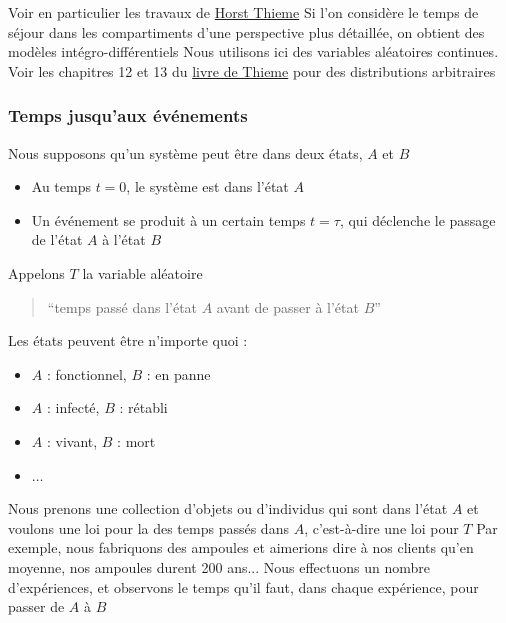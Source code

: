 \documentclass[aspectratio=169]{beamer}\usepackage[]{graphicx}\usepackage[]{xcolor}
\begin{document}
\begin{frame}
Voir en particulier les travaux de \href{https://scholar.google.ca/citations?user=o7R6ZHMAAAAJ}{Horst Thieme}
\vfill
Si l'on considère le temps de séjour dans les compartiments d'une perspective plus détaillée, on obtient des modèles intégro-différentiels
\vfill
Nous utilisons ici des variables aléatoires continues. Voir les chapitres 12 et 13 du \href{https://press.princeton.edu/books/paperback/9780691092911/mathematics-in-population-biology}{livre de Thieme} pour des distributions arbitraires
\end{frame}


\begin{frame}\frametitle{Temps jusqu'aux événements}
Nous supposons qu'un système peut être dans deux états, $A$ et $B$
\begin{itemize}
\item Au temps $t=0$, le système est dans l'état $A$
\item Un événement se produit à un certain temps $t=\tau$, qui déclenche le passage de
l'état $A$ à l'état $B$
\end{itemize}
\vfill
Appelons $T$ la variable aléatoire 
\begin{quote}
``temps passé dans l'état $A$ avant de passer à l'état $B$''
\end{quote}
\end{frame}

\begin{frame}
Les états peuvent être n'importe quoi :
\begin{itemize}
\item $A$ : fonctionnel, $B$ : en panne
\item $A$ : infecté, $B$ : rétabli
\item $A$ : vivant, $B$ : mort
\item $\ldots$
\end{itemize}
\vfill
Nous prenons une collection d'objets ou d'individus qui sont dans l'état $A$ et voulons
une loi pour la  des temps passés dans $A$, c'est-à-dire une loi pour $T$
\vfill
Par exemple, nous fabriquons des ampoules et aimerions dire à nos clients qu'en moyenne, nos ampoules durent 200 ans...
\vfill
Nous effectuons un nombre  d'expériences, et observons le temps qu'il faut, dans chaque expérience, pour passer de $A$ à $B$
\end{frame}
\end{document}

